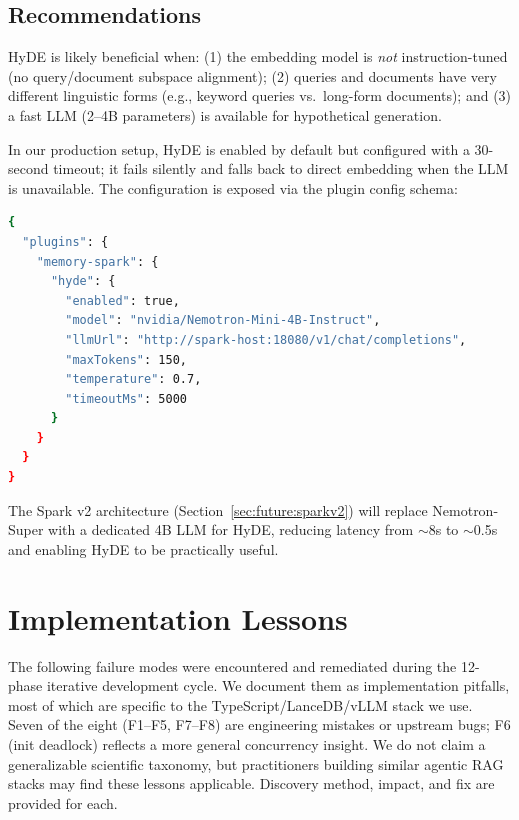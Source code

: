 \documentclass[11pt]{article}
\begin{document}
\subsection{Recommendations}

HyDE is likely beneficial when: (1) the embedding model is \emph{not} instruction-tuned
(no query/document subspace alignment); (2) queries and documents have very different
linguistic forms (e.g., keyword queries vs.\ long-form documents); and (3) a fast LLM
(2--4B parameters) is available for hypothetical generation.

In our production setup, HyDE is enabled by default but configured with a 30-second
timeout; it fails silently and falls back to direct embedding when the LLM is
unavailable. The configuration is exposed via the plugin config schema:

\begin{lstlisting}[language=bash, caption={HyDE configuration in openclaw.json}]
{
  "plugins": {
    "memory-spark": {
      "hyde": {
        "enabled": true,
        "model": "nvidia/Nemotron-Mini-4B-Instruct",
        "llmUrl": "http://spark-host:18080/v1/chat/completions",
        "maxTokens": 150,
        "temperature": 0.7,
        "timeoutMs": 5000
      }
    }
  }
}
\end{lstlisting}

The Spark v2 architecture (Section~\ref{sec:future:sparkv2}) will replace Nemotron-Super
with a dedicated 4B LLM for HyDE, reducing latency from $\sim$8s to $\sim$0.5s and
enabling HyDE to be practically useful.

\section{Implementation Lessons}
\label{sec:failures}

The following failure modes were encountered and remediated during the 12-phase iterative
development cycle. We document them as implementation pitfalls, most of which are
specific to the TypeScript/LanceDB/vLLM stack we use. Seven of the eight (F1--F5, F7--F8)
are engineering mistakes or upstream bugs; F6 (init deadlock) reflects a more general
concurrency insight. We do not claim a generalizable scientific taxonomy, but practitioners
building similar agentic RAG stacks may find these lessons applicable.
Discovery method, impact, and fix are provided for each.
\end{document}

